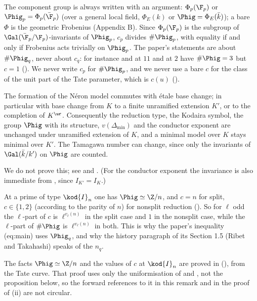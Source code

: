 \begin{convention}\label{conv:reduction:phig}
The component group is always written with an argument: $\Phi_p(\F_p)$ or $\Phig_p=\Phi_p(\bar\F_p)$ (over a general local
field, $\Phi_E(k)$ or $\Phig=\Phi_E(\bar k)$); a bare $\Phi$ is the geometric Frobenius (Appendix B). Since $\Phi_p(\F_p)$
is the subgroup of $\Gal(\bar\F_p/\F_p)$-invariants of $\Phig_p$, $c_p$ divides $\#\Phig_p$, with equality if and only
if Frobenius acts trivially on $\Phig_p$. The paper's statements are about $\#\Phig_q$, never about $c_q$: for
instance  and  at $11$ and  at $2$ have $\#\Phig=3$ but $c=1$
(). We never write $c_p$ for $\#\Phig_p$, and we never use a bare $c$ for the class of
the unit part of the Tate parameter, which is $c(u)$ ().
\end{convention}

\begin{proposition}\label{prop:reduction:etale-base-change}
The formation of the N\'eron model commutes with \'etale base change; in particular with base change from $K$
to a finite unramified extension $K'$, or to the completion of $K^{\ur}$. Consequently the reduction type, the
Kodaira symbol, the group $\Phig$ with its structure, $v(\Delta_{\min})$ and the conductor exponent are
unchanged under unramified extension of $K$, and a minimal model over $K$ stays minimal over $K'$. The Tamagawa
number can change, since only the invariants of $\Gal(\bar k/k')$ on $\Phig$ are counted.
\end{proposition}

We do not prove this; see \cite[Section 7.2]{BLR} and \cite[IV.6]{SilvermanATAEC}. (For the conductor
exponent the invariance is also immediate from , since $I_{K'}=I_K$.)

\begin{remark}\label{rem:reduction:tamagawa-mult}
At a prime of type $\kod{I}_n$ one has $\Phig\simeq\Z/n$, and $c=n$ for split, $c\in\{1,2\}$ (according to the parity
of $n$) for nonsplit reduction (). So for $\ell$ odd the $\ell$-part of $c$ is
$\ell^{v_\ell(n)}$ in the split case and $1$ in the nonsplit case, while the $\ell$-part of $\#\Phig$ is
$\ell^{v_\ell(n)}$ in both. This is why the paper's inequality (eq:main) uses $\Phig_q$, and why the history paragraph
of its Section 1.5 (Ribet and Takahashi) speaks of the $n_q$.

The facts $\Phig\simeq\Z/n$ and the values of $c$ at $\kod{I}_n$ are proved in 
(), from the Tate curve. That proof uses only the uniformisation of
 and , not the proposition below, so the
forward references to it in this remark and in the proof of (ii) are not
circular.
\end{remark}

